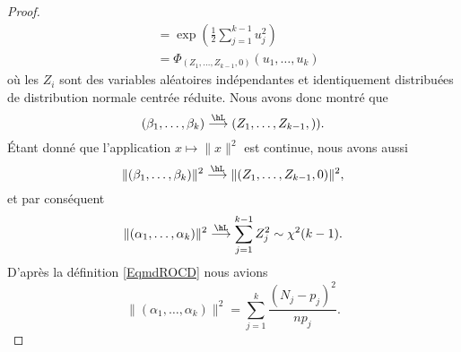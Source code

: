 \begin{proof}
\begin{subequations}
\begin{align}
            &=\exp\left( \frac{ 1 }{2}\sum_{j=1}^{k-1}u_j^2 \right)\\
            &=\Phi_{(Z_1,\ldots, Z_{k-1},0)}(u_1,\ldots, u_k)
        \end{align}
    \end{subequations}
    où les \( Z_i\) sont des variables aléatoires indépendantes et identiquement distribuées de distribution normale centrée réduite. Nous avons donc montré que
    \begin{equation}
        (\beta_1,\ldots, \beta_k)\stackrel{\hL}{\longrightarrow}(Z_1,\ldots, Z_{k-1},)).
    \end{equation}
    Étant donné que l'application \( x\mapsto \| x \|^2\) est continue, nous avons aussi
    \begin{equation}
        \| (\beta_1,\ldots, \beta_k) \|^2\stackrel{\hL}{\longrightarrow}\| (Z_1,\ldots, Z_{k-1},0) \|^2,
    \end{equation}
    et par conséquent
    \begin{equation}
        \| (\alpha_1,\ldots, \alpha_k) \|^2\stackrel{\hL}{\longrightarrow}\sum_{j=1}^{k-1}Z_j^2\sim\chi^2(k-1).
    \end{equation}
    D'après la définition \eqref{EqmdROCD} nous avions
    \begin{equation}
        \| (\alpha_1,\ldots, \alpha_k) \|^2=\sum_{j=1}^k\frac{ (N_j-p_j)^2 }{ np_j }.
    \end{equation}

\end{proof}
